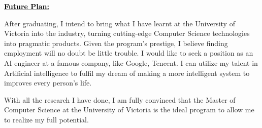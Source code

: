 \documentclass[12pt]{article}
\newcommand{\statement}[1]{\par\medskip
  \underline{\textcolor{black}{\textbf{#1:}}}\space
}
\begin{document}
\bigskip

\statement{Future Plan}

After graduating, I intend to bring what I have learnt at the University of Victoria into the industry, turning cutting-edge Computer Science technologies into pragmatic products. Given the program's prestige, I believe finding employment will no doubt be little trouble. I would like to seek a position as an AI engineer at a famous company, like Google, Tencent. I can utilize my talent in Artificial intelligence to fulfil my dream of making a more intelligent system to improves every person's life.

\bigskip

With all the research I have done, I am fully convinced that the Master of Computer Science at the University of Victoria is the ideal program to allow me to realize my full potential.
\end{document}
